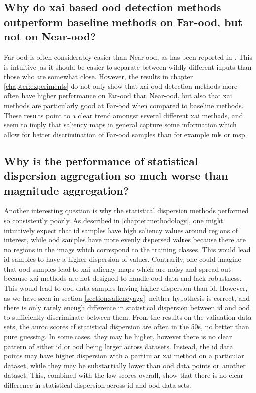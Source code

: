 \documentclass[UKenglish]{uiomasterthesis} %
\theoremstyle{definition}
\begin{document}
\subsection{Why do \ac{xai} based \ac{ood} detection methods outperform baseline methods on Far-\ac{ood}, but not on Near-\ac{ood}?}

Far-\ac{ood} is often considerably easier than Near-\ac{ood}, as has been reported in \cite{openood}. This is intuitive, as it should be easier to separate between wildly different inputs than those who are somewhat close. However, the results in chapter \ref{chapter:experiments} do not only show that \ac{xai} \ac{ood} detection methods more often have higher performance on Far-\ac{ood} than Near-\ac{ood}, but also that \ac{xai} methods are particularly good at Far-\ac{ood} when compared to baseline methods. These results point to a clear trend amongst several different \ac{xai} methods, and seem to imply that saliency maps in general capture some information which allow for better discrimination of Far-\ac{ood} samples than for example \ac{mls} or \ac{msp}.

\subsection{Why is the performance of statistical dispersion aggregation so much worse than magnitude aggregation?}

Another interesting question is why the statistical dispersion methods performed so consistently poorly. As described in \ref{chapter:methodology}, one might intuitively expect that \ac{id} samples have high saliency values around regions of interest, while \ac{ood} samples have more evenly dispersed values because there are no regions in the image which correspond to the training classes. This would lead \ac{id} samples to have a higher dispersion of values. Contrarily, one could imagine that \ac{ood} samples lead to \ac{xai} saliency maps which are noisy and spread out because \ac{xai} methods are not designed to handle \ac{ood} data and lack robustness. This would lead to \ac{ood} data samples having higher dispersion than \ac{id}. However, as we have seen in section \ref{section:saliencyagg}, neither hypothesis is correct, and there is only rarely enough difference in statistical dispersion between \ac{id} and \ac{ood} to sufficiently discriminate between them. From the results on the validation data sets, the \ac{auroc} scores of statistical dispersion are often in the 50s, no better than pure guessing. In some cases, they may be higher, however there is no clear pattern of either \ac{id} or \ac{ood} being larger across datasets. Instead, the \ac{id} data points may have higher dispersion with a particular \ac{xai} method on a particular dataset, while they may be substantially lower than \ac{ood} data points on another dataset. This, combined with the low scores overall, show that there is no clear difference in statistical dispersion across \ac{id} and \ac{ood} data sets.
\end{document}
